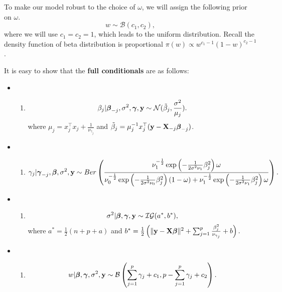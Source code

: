 \documentclass[]{book}
\providecommand{\tightlist}{%
  \setlength{\itemsep}{0pt}\setlength{\parskip}{0pt}}
\begin{document}
To make our model robust to the choice of \(\omega\), we will assign the following prior on \(\omega\).
\[w\sim \mathcal{B}(c_1,c_2),\]
where we will use \(c_1=c_2=1\), which leads to the uniform distribution. Recall the density function of beta distribution is proportional \(\pi(w)\propto w^{c_1-1}(1-w)^{c_2-1}\).

It is easy to show that the \textbf{full conditionals} are as follows:

\begin{itemize}
\item
  \begin{enumerate}
  \def\labelenumi{\arabic{enumi})}
  \tightlist
  \item
    \[\beta_j|{\boldsymbol \beta}_{-j}, \sigma^2, {\boldsymbol \gamma}, {\bf y}\sim \mathcal{N}(\tilde{\beta}_j, \frac{\sigma^2}{\mu_j}).\]
    where \(\mu_j= x_j^{{\top}}x_j + \frac{1}{\nu_{\gamma_j}}\) and \(\tilde{\beta}_j = \mu_j^{-1}x_j^{{\top}}({\bf y}- {\bf X}_{-j}{\boldsymbol \beta}_{-j})\).
  \end{enumerate}
\item
  \begin{enumerate}
  \def\labelenumi{\arabic{enumi})}
  \setcounter{enumi}{1}
  \tightlist
  \item
    \[
    \gamma_j |{\boldsymbol \gamma}_{-j}, {\boldsymbol \beta}, \sigma^2, {\bf y}\sim Ber\left(\frac{ \nu_1^{-\frac{1}{2}}
    \exp\left(-\frac{1}{2\sigma^2\nu_1}\beta_j^2\right)\omega}
    {  \nu_0^{-\frac{1}{2}}\exp\left(-\frac{1}{2\sigma^2\nu_0}\beta_j^2\right)\left(1-\omega\right)+
     \nu_1^{-\frac{1}{2}}\exp\left(-\frac{1}{2\sigma^2\nu_1}\beta_j^2\right)\omega}\right).
    \]
  \end{enumerate}
\item
  \begin{enumerate}
  \def\labelenumi{\arabic{enumi})}
  \setcounter{enumi}{2}
  \tightlist
  \item
    \[\sigma^2|{\boldsymbol \beta}, {\boldsymbol \gamma}, {\bf y}\sim \mathcal{IG}(a^*,b^*),\]
    where \(a^*=\frac{1}{2}(n+p+a)\) and \(b^* = \frac{1}{2}\left(\|{\bf y}-{\bf X}{\boldsymbol \beta}\|^2 + \sum_{j=1}^{p}\frac{\beta_j^2}{\nu_{\gamma_j}} + b\right).\)
  \end{enumerate}
\item
  \begin{enumerate}
  \def\labelenumi{\arabic{enumi})}
  \setcounter{enumi}{3}
  \tightlist
  \item
    \[w|{\boldsymbol \beta},{\boldsymbol \gamma},\sigma^2,{\bf y}\sim \mathcal{B}\left(\sum_{j=1}^p \gamma_j+c_1,p-\sum_{j=1}^p \gamma_j+c_2\right).\]
  \end{enumerate}
\end{itemize}
\end{document}
